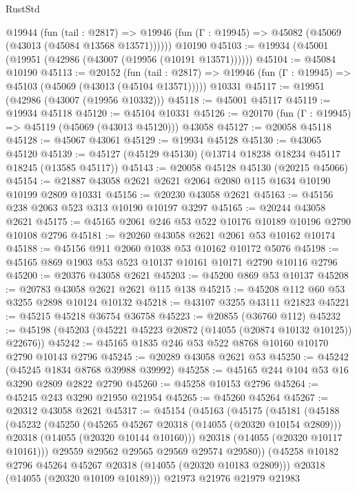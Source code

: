 \begin{lexlean}{RustStd}
\begin{coremodule}
    @19944
      (fun (tail : @2817) =>
      @19946 (fun (Γ : @19945) => @45082 (@45069 (@43013 (@45084 @13568 @13571))))))
    @10190
@45103 := @19934 (@45001 (@19951 (@42986 (@43007 (@19956 (@10191 @13571))))))
@45104 := @45084 @10190
@45113 := @20152
    (fun (tail : @2817) => @19946 (fun (Γ : @19945) => @45103 (@45069 (@43013 (@45104 @13571)))))
    @10331
@45117 := @19951 (@42986 (@43007 (@19956 @10332)))
@45118 := @45001 @45117
@45119 := @19934 @45118
@45120 := @45104 @10331
@45126 := @20170 (fun (Γ : @19945) => @45119 (@45069 (@43013 @45120))) @43058
@45127 := @20058 @45118
@45128 := @45067 @43061
@45129 := @19934 @45128
@45130 := @43065 @45120
@45139 := @45127 (@45129 @45130) (@13714 @18238 @18234 @45117 @18245 (@13585 @45117))
@45143 := @20058 @45128 @45130 (@20215 @45066)
@45154 := @21887 @43058 @2621 @2621 @2064 @2080 @115 @1634 @10190 @10199 @2809 @10331
@45156 := @20230 @43058 @2621
@45163 := @45156 @238 @2063 @523 @313 @10190 @10197 @3297
@45165 := @20244 @43058 @2621
@45175 := @45165 @2061 @246 @53 @522 @10176 @10189 @10196 @2790 @10108 @2796
@45181 := @20260 @43058 @2621 @2061 @53 @10162 @10174
@45188 := @45156 @911 @2060 @1038 @53 @10162 @10172 @5076
@45198 := @45165 @869 @1903 @53 @523 @10137 @10161 @10171 @2790 @10116 @2796
@45200 := @20376 @43058 @2621
@45203 := @45200 @869 @53 @10137
@45208 := @20783 @43058 @2621 @2621 @115 @138
@45215 := @45208 @112 @60 @53 @3255 @2898 @10124 @10132
@45218 := @43107 @3255 @43111 @21823
@45221 := @45215 @45218 @36754 @36758
@45223 := @20855 (@36760 @112)
@45232 := @45198 (@45203 (@45221 @45223 @20872 (@14055 (@20874 @10132 @10125)) @22676))
@45242 := @45165 @1835 @246 @53 @522 @8768 @10160 @10170 @2790 @10143 @2796
@45245 := @20289 @43058 @2621 @53
@45250 := @45242 (@45245 @1834 @8768 @39988 @39992)
@45258 := @45165 @244 @104 @53 @16 @3290 @2809 @2822 @2790
@45260 := @45258 @10153 @2796
@45264 := @45245 @243 @3290 @21950 @21954
@45265 := @45260 @45264
@45267 := @20312 @43058 @2621
@45317 := @45154
    (@45163
      (@45175
        (@45181
          (@45188
            (@45232
              (@45250
                (@45265 @45267 @20318 (@14055 (@20320 @10154 @2809)))
                @20318
                (@14055 (@20320 @10144 @10160)))
              @20318
              (@14055 (@20320 @10117 @10161)))
            @29559
            @29562
            @29565
            @29569
            @29574
            @29580))
        (@45258 @10182 @2796 @45264 @45267 @20318 (@14055 (@20320 @10183 @2809)))
        @20318
        (@14055 (@20320 @10109 @10189)))
      @21973
      @21976
      @21979
      @21983

\end{coremodule}
\end{lexlean}
